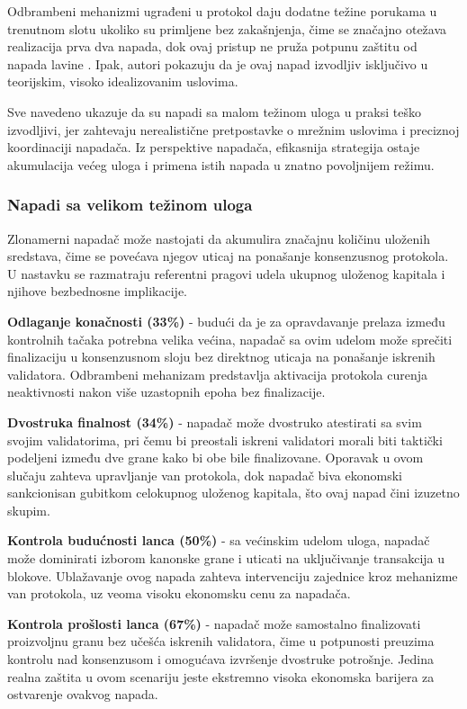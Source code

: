 Odbrambeni mehanizmi ugrađeni u protokol daju dodatne težine porukama u trenutnom slotu ukoliko su primljene bez zakašnjenja, čime se značajno otežava realizacija prva dva napada, dok ovaj pristup ne pruža potpunu zaštitu od napada lavine \cite{neu2022two}. Ipak, autori pokazuju da je ovaj napad izvodljiv isključivo u teorijskim, visoko idealizovanim uslovima.

Sve navedeno ukazuje da su napadi sa malom težinom uloga u praksi teško izvodljivi, jer zahtevaju nerealistične pretpostavke o mrežnim uslovima i preciznoj koordinaciji napadača. Iz perspektive napadača, efikasnija strategija ostaje akumulacija većeg uloga i primena istih napada u znatno povoljnijem režimu.

\subsubsection{Napadi sa velikom težinom uloga}
Zlonamerni napadač može nastojati da akumulira značajnu količinu uloženih sredstava, čime se povećava njegov uticaj na ponašanje konsenzusnog protokola. U nastavku se razmatraju referentni pragovi udela ukupnog uloženog kapitala i njihove bezbednosne implikacije.

\begin{description}
\item \textbf{Odlaganje konačnosti (33\%)} - budući da je za opravdavanje prelaza između kontrolnih tačaka potrebna velika većina, napadač sa ovim udelom može sprečiti finalizaciju u konsenzusnom sloju bez direktnog uticaja na ponašanje iskrenih validatora. Odbrambeni mehanizam predstavlja aktivacija protokola curenja neaktivnosti nakon više uzastopnih epoha bez finalizacije.
\item \textbf{Dvostruka finalnost (34\%)} - napadač može dvostruko atestirati sa svim svojim validatorima, pri čemu bi preostali iskreni validatori morali biti taktički podeljeni između dve grane kako bi obe bile finalizovane. Oporavak u ovom slučaju zahteva upravljanje van protokola, dok napadač biva ekonomski sankcionisan gubitkom celokupnog uloženog kapitala, što ovaj napad čini izuzetno skupim.
\item \textbf{Kontrola budućnosti lanca (50\%)} - sa većinskim udelom uloga, napadač može dominirati izborom kanonske grane i uticati na uključivanje transakcija u blokove. Ublažavanje ovog napada zahteva intervenciju zajednice kroz mehanizme van protokola, uz veoma visoku ekonomsku cenu za napadača.
\item \textbf{Kontrola prošlosti lanca (67\%)} - napadač može samostalno finalizovati proizvoljnu granu bez učešća iskrenih validatora, čime u potpunosti preuzima kontrolu nad konsenzusom i omogućava izvršenje dvostruke potrošnje. Jedina realna zaštita u ovom scenariju jeste ekstremno visoka ekonomska barijera za ostvarenje ovakvog napada.
\end{description}

